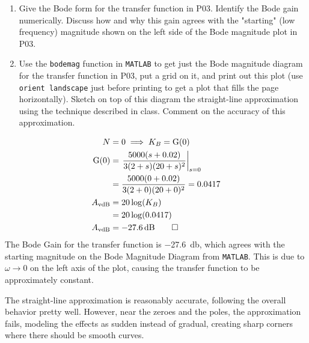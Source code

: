 \begin{hwkProblem}{4}{}

	\begin{enumerate}
		\item Give the Bode form for the transfer function in P03. Identify the Bode gain numerically. Discuss how and why this gain agrees with the "starting" (low frequency) magnitude shown on the left side of the Bode magnitude plot in P03.
		\item Use the \lstinline{bodemag} function in \lstinline{MATLAB} to get just the Bode magnitude diagram for the transfer function in P03, put a grid on it, and print out this plot (use \lstinline{orient landscape} just before printing to get a plot that fills the page horizontally). Sketch on top of this diagram the straight-line approximation using the technique described in class. Comment on the accuracy of this approximation.
	\end{enumerate}

	\hwkSol{}

	\hwkPart{}

	\begin{align*}
		N &= 0 \implies K_{B} = \func{G}[0] \\
		\func{G}[0] &= \left. \frac{5000(s+0.02)}{3(2+s)(20+s)^{2}}\right|_{s=0} \\
			    &= \frac{5000(0+0.02)}{3(2+0)(20+0)^{2}} = 0.0417 \\
		A_{\text{vdB}} &= 20 \log(K_{B}) \\
			       &= 20 \log(0.0417) \\
		A_{\text{vdB}} &= \qty{-27.6}{\decibel} \qed
	\end{align*}
	The Bode Gain for the transfer function is \qty{-27.6}{\decibel}, which agrees with the starting magnitude on the Bode Magnitude Diagram from \lstinline{MATLAB}. This is due to \( \omega \to 0 \) on the left axis of the plot, causing the transfer function to be approximately constant.

	\hwkPart{}

	The straight-line approximation is reasonably accurate, following the overall behavior pretty well. However, near the zeroes and the poles, the approximation fails, modeling the effects as sudden instead of gradual, creating sharp corners where there should be smooth curves.


\end{hwkProblem}

